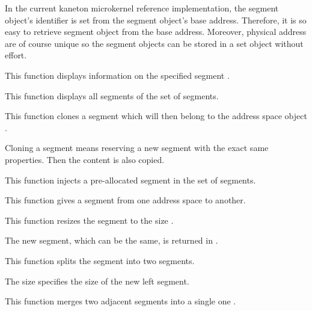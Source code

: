 In the current kaneton microkernel reference implementation, the
segment object's identifier is set from the segment object's base
address. Therefore, it is so easy to retrieve segment object from
the base address. Moreover, physical address are of course unique
so the segment objects can be stored in a set object without effort.

	 {
	   This function displays information on the specified segment
	   .
	 }

	 {
	   This function displays all segments of the set of segments.
	 }

	 {
	   This function clones a segment which will then belong to
	   the address space object .

	   Cloning a segment means reserving a new segment with the
	   exact same properties. Then the content is also copied.
	 }

	 {
	   This function injects a pre-allocated segment in the set of
	   segments.
	 }

	 {
	   This function gives a segment from one address space to another.
	 }

	 {
	   This function resizes the segment  to the
	   size .

	   The new segment, which can be the same, is returned in
	   .
	 }

	 {
	   This function splits the segment  into two segments.

	   The size  specifies the size of the new left segment.
	 }

	 {
	   This function merges two adjacent segments into a single
	   one .
	 }

